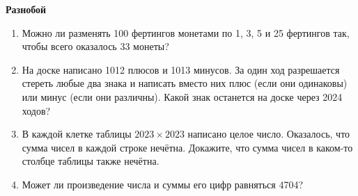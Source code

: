 \documentclass{article}
\begin{document}
\large
	
\begin{center}
	\textbf{Разнобой}
\end{center}


\begin{enumerate}[label*=\protect\fbox{\arabic{enumi}}]


\item Можно ли разменять 100 фертингов монетами по 1, 3, 5 и 25 фертингов так, чтобы всего оказалось 33 монеты?

\item На доске написано 1012 плюсов и 1013 минусов. За один ход разрешается стереть любые два знака и написать вместо них плюс (если они одинаковы) или минус (если они различны). Какой знак останется на доске через 2024 ходов?

\item В каждой клетке таблицы $2023\times2023$ написано целое число. Оказалось, что сумма чисел в каждой строке нечётна. Докажите, что сумма чисел в каком-то столбце таблицы также нечётна.

\item Может ли произведение числа и суммы его цифр равняться 4704?



\end{enumerate}
\end{document}
